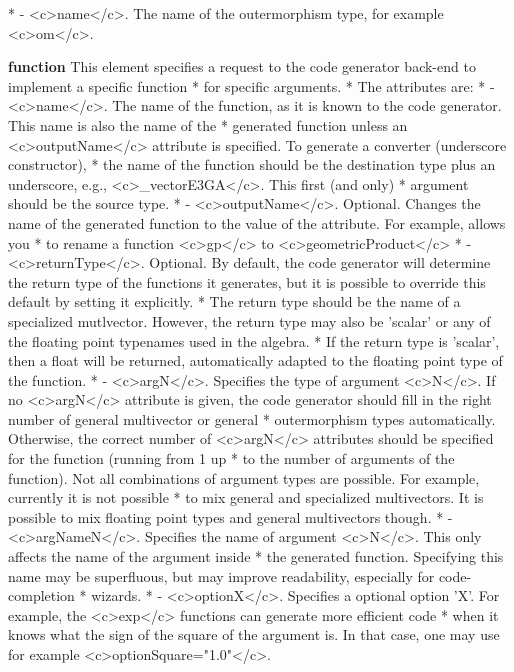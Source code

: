 \documentclass[10pt, a4paper]{article}
\begin{document}
\begin{itemize}
{ *        - <c>name</c>. The name of the outermorphism type, for example <c>om</c>.
\item {\bf function} This element specifies a request to the code generator back-end to implement a specific function
 *     for specific arguments.
 *     The attributes are:
 *        - <c>name</c>. The name of the function, as it is known to the code generator. This name is also the name of the
 *           generated function unless an <c>outputName</c> attribute is specified. To generate a converter (underscore constructor),
 *           the name of the function should be the destination type plus an underscore, e.g., <c>_vectorE3GA</c>. This first (and only)
 *           argument should be the source type.
 *        - <c>outputName</c>. Optional. Changes the name of the generated function to the value of the attribute. For example, allows you
 *          to rename a function <c>gp</c> to <c>geometricProduct</c>
 *        - <c>returnType</c>. Optional. By default, the code generator will determine the return type of the functions it generates, but it is possible to override this default by setting it explicitly. 
 *          The return type should be the name of a specialized mutlvector. However, the return type may also be 'scalar' or any of the floating point typenames used in the algebra.
 *          If the return type is 'scalar', then a float will be returned, automatically adapted to the floating point type of the function.
 *        - <c>argN</c>. Specifies the type of argument <c>N</c>. If no <c>argN</c> attribute is given, the code generator should fill in the right number of general multivector or general 
 *           outermorphism types automatically. Otherwise, the correct number of <c>argN</c> attributes should be specified for the function (running from 1 up
 *           to the number of arguments of the function). Not all combinations of argument types are possible. For example, currently it is not possible
 *           to mix general and specialized multivectors. It is possible to mix floating point types and general multivectors though.
 *        - <c>argNameN</c>. Specifies the name of argument <c>N</c>. This only affects the name of the argument inside
 *           the generated function. Specifying this name may be superfluous, but may improve readability, especially for code-completion
 *           wizards. 
 *        - <c>optionX</c>. Specifies a optional option 'X'. For example, the <c>exp</c> functions can generate more efficient code
 *           when it knows what the sign of the square of the argument is. In that case, one may use for example <c>optionSquare="1.0"</c>.
}
\end{itemize}
\end{document}
